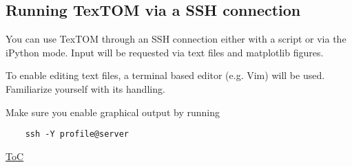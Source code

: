 \subsection{Running TexTOM via a SSH connection}
You can use TexTOM through an SSH connection either with a script or via the iPython mode.
Input will be requested via text files and matplotlib figures.

To enable editing text files, a terminal based editor (e.g. Vim) will be used.
Familiarize yourself with its handling.

Make sure you enable graphical output by running 
\begin{verbatim}
    ssh -Y profile@server
\end{verbatim}

\begin{flushright}
    \hyperref[toc]{ToC}
\end{flushright}